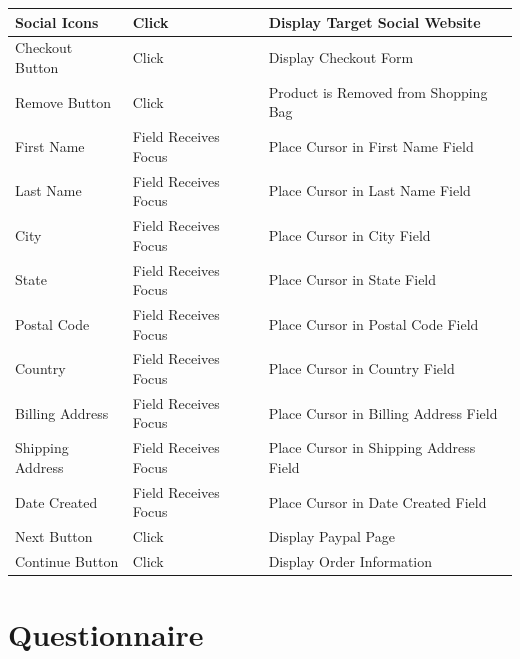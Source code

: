 \documentclass{report}
\begin{document}
\begin{center}
	\begin{tabular}{ m{1.5in} | m{1.5in} | m{1.5in} }
	Social Icons & Click & Display Target Social Website \\
	\hline
	Checkout Button 		& Click 					& Display Checkout Form \\
	\hline
	Remove Button 		& Click 					& Product is Removed from Shopping Bag \\
	\hline
	First Name 			& Field Receives Focus 	& Place Cursor in First Name Field \\
	\hline
	Last Name 			& Field Receives Focus 	& Place Cursor in Last Name Field \\
	\hline
	City 				& Field Receives Focus 	& Place Cursor in City Field \\
	\hline
	State 				& Field Receives Focus 	& Place Cursor in State Field \\
	\hline
	Postal Code 			& Field Receives Focus 	& Place Cursor in Postal Code Field \\
	\hline
	Country 				& Field Receives Focus 	& Place Cursor in Country Field \\
	\hline
	Billing Address 		& Field Receives Focus 	& Place Cursor in Billing Address Field \\
	\hline
	Shipping Address 	& Field Receives Focus 	& Place Cursor in Shipping Address Field \\
	\hline
	Date Created 		& Field Receives Focus 	& Place Cursor in Date Created Field \\
	\hline
	Next Button 			& Click 					& Display Paypal Page \\
	\hline
	Continue Button 		& Click 					& Display Order Information \\
	
	\end{tabular}
		
	
\end{center}

\chapter{Questionnaire}
\end{document}
